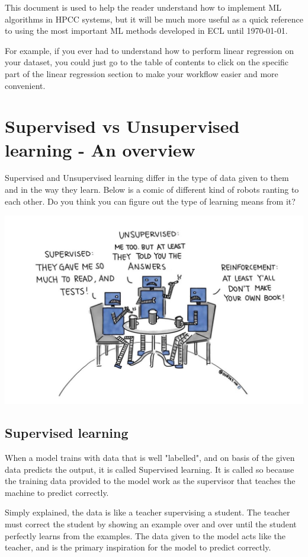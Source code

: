 This document is used to help the reader understand how to implement ML algorithms in HPCC systems, but it will be much more useful as a quick reference to using the most important ML methods developed in ECL until \today.

For example, if you ever had to understand how to perform linear regression on your dataset, you could just go to the table of contents to click on the specific part of the linear regression section to make your workflow easier and more convenient.

\section{Supervised vs Unsupervised learning - An overview}\label{sec:supe_vs_unsupe}

Supervised and Unsupervised learning differ in the type of data given to them and in the way they learn. Below is a comic of different kind of robots ranting to each other. Do you think you can figure out the type of learning means from it?

\includegraphics[width=\textwidth]{../media/intro/learningtypes.jpg}

\subsection{Supervised learning}\label{subsec:supe}

When a model trains with data that is well "labelled", and on basis of the given data predicts the output, it is called Supervised learning. It is called so because the training data provided to the model work as the supervisor that teaches the machine to predict correctly. 

Simply explained, the data is like a teacher supervising a student. The teacher must correct the student by showing an example over and over until the student perfectly learns from the examples. The data given to the model acts like the teacher, and is the primary inspiration for the model to predict correctly. 

